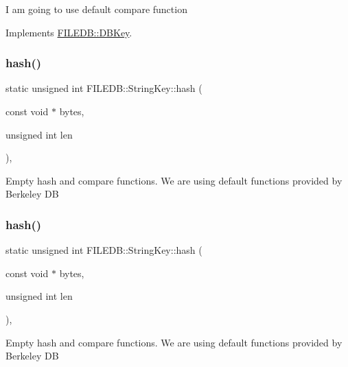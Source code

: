 I am going to use default compare function 

Implements \mbox{\hyperlink{classFILEDB_1_1DBKey_a416c32ba10caf76e6b7ff4986cfc3c05}{F\+I\+L\+E\+D\+B\+::\+D\+B\+Key}}.

\mbox{\label{classFILEDB_1_1StringKey_a505786f9d6a7eec5531eac0f0026d8c3}} 
\subsubsection{\texorpdfstring{hash()}{hash()}\hspace{0.1cm}{\footnotesize\ttfamily [1/3]}}
{\footnotesize\ttfamily static unsigned int F\+I\+L\+E\+D\+B\+::\+String\+Key\+::hash (\begin{DoxyParamCaption}\item[{const void $\ast$}]{bytes,  }\item[{unsigned int}]{len }\end{DoxyParamCaption})\hspace{0.3cm}{\ttfamily [inline]}, {\ttfamily [static]}}

Empty hash and compare functions. We are using default functions provided by Berkeley DB \mbox{\label{classFILEDB_1_1StringKey_a505786f9d6a7eec5531eac0f0026d8c3}} 
\subsubsection{\texorpdfstring{hash()}{hash()}\hspace{0.1cm}{\footnotesize\ttfamily [2/3]}}
{\footnotesize\ttfamily static unsigned int F\+I\+L\+E\+D\+B\+::\+String\+Key\+::hash (\begin{DoxyParamCaption}\item[{const void $\ast$}]{bytes,  }\item[{unsigned int}]{len }\end{DoxyParamCaption})\hspace{0.3cm}{\ttfamily [inline]}, {\ttfamily [static]}}

Empty hash and compare functions. We are using default functions provided by Berkeley DB \mbox{\label{classFILEDB_1_1StringKey_a505786f9d6a7eec5531eac0f0026d8c3}} 
